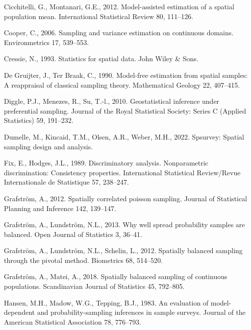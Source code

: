 \documentclass[]{elsarticle} %
\begin{document}
\leavevmode\hypertarget{ref-cicchitelli2012model}{}%
Cicchitelli, G., Montanari, G.E., 2012. Model-assisted estimation of a
spatial population mean. International Statistical Review 80, 111--126.

\leavevmode\hypertarget{ref-cooper2006sampling}{}%
Cooper, C., 2006. Sampling and variance estimation on continuous
domains. Environmetrics 17, 539--553.

\leavevmode\hypertarget{ref-cressie1993statistics}{}%
Cressie, N., 1993. Statistics for spatial data. John Wiley \& Sons.

\leavevmode\hypertarget{ref-de1990model}{}%
De Gruijter, J., Ter Braak, C., 1990. Model-free estimation from spatial
samples: A reappraisal of classical sampling theory. Mathematical
Geology 22, 407--415.

\leavevmode\hypertarget{ref-diggle2010geostatistical}{}%
Diggle, P.J., Menezes, R., Su, T.-l., 2010. Geostatistical inference
under preferential sampling. Journal of the Royal Statistical Society:
Series C (Applied Statistics) 59, 191--232.

\leavevmode\hypertarget{ref-dumelle2022spsurvey}{}%
Dumelle, M., Kincaid, T.M., Olsen, A.R., Weber, M.H., 2022. Spsurvey:
Spatial sampling design and analysis.

\leavevmode\hypertarget{ref-fix1989discriminatory}{}%
Fix, E., Hodges, J.L., 1989. Discriminatory analysis. Nonparametric
discrimination: Consistency properties. International Statistical
Review/Revue Internationale de Statistique 57, 238--247.

\leavevmode\hypertarget{ref-grafstrom2012spatiallypoisson}{}%
Grafström, A., 2012. Spatially correlated poisson sampling. Journal of
Statistical Planning and Inference 142, 139--147.

\leavevmode\hypertarget{ref-grafstrom2013well}{}%
Grafström, A., Lundström, N.L., 2013. Why well spread probability
samples are balanced. Open Journal of Statistics 3, 36--41.

\leavevmode\hypertarget{ref-grafstrom2012spatially}{}%
Grafström, A., Lundström, N.L., Schelin, L., 2012. Spatially balanced
sampling through the pivotal method. Biometrics 68, 514--520.

\leavevmode\hypertarget{ref-grafstrom2018spatially}{}%
Grafström, A., Matei, A., 2018. Spatially balanced sampling of
continuous populations. Scandinavian Journal of Statistics 45, 792--805.

\leavevmode\hypertarget{ref-hansen1983evaluation}{}%
Hansen, M.H., Madow, W.G., Tepping, B.J., 1983. An evaluation of
model-dependent and probability-sampling inferences in sample surveys.
Journal of the American Statistical Association 78, 776--793.
\end{document}

